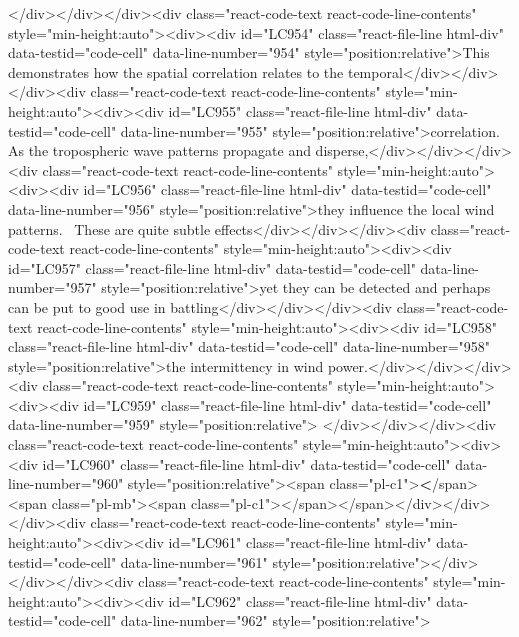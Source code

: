 {{{{{{</div></div></div><div class="react-code-text react-code-line-contents" style="min-height:auto"><div><div id="LC954" class="react-file-line html-div" data-testid="code-cell" data-line-number="954" style="position:relative">This demonstrates how the spatial correlation relates to the temporal</div></div></div><div class="react-code-text react-code-line-contents" style="min-height:auto"><div><div id="LC955" class="react-file-line html-div" data-testid="code-cell" data-line-number="955" style="position:relative">correlation. As the tropospheric wave patterns propagate and disperse,</div></div></div><div class="react-code-text react-code-line-contents" style="min-height:auto"><div><div id="LC956" class="react-file-line html-div" data-testid="code-cell" data-line-number="956" style="position:relative">they influence the local wind patterns.~ These are quite subtle effects</div></div></div><div class="react-code-text react-code-line-contents" style="min-height:auto"><div><div id="LC957" class="react-file-line html-div" data-testid="code-cell" data-line-number="957" style="position:relative">yet they can be detected and perhaps can be put to good use in battling</div></div></div><div class="react-code-text react-code-line-contents" style="min-height:auto"><div><div id="LC958" class="react-file-line html-div" data-testid="code-cell" data-line-number="958" style="position:relative">the intermittency in wind power.</div></div></div><div class="react-code-text react-code-line-contents" style="min-height:auto"><div><div id="LC959" class="react-file-line html-div" data-testid="code-cell" data-line-number="959" style="position:relative">
</div></div></div><div class="react-code-text react-code-line-contents" style="min-height:auto"><div><div id="LC960" class="react-file-line html-div" data-testid="code-cell" data-line-number="960" style="position:relative"><span class="pl-c1">\textbf</span>{<span class="pl-mb"><span class="pl-c1">\hfill\break</span></span></div></div></div><div class="react-code-text react-code-line-contents" style="min-height:auto"><div><div id="LC961" class="react-file-line html-div" data-testid="code-cell" data-line-number="961" style="position:relative">}</div></div></div><div class="react-code-text react-code-line-contents" style="min-height:auto"><div><div id="LC962" class="react-file-line html-div" data-testid="code-cell" data-line-number="962" style="position:relative">
}}}}}}
